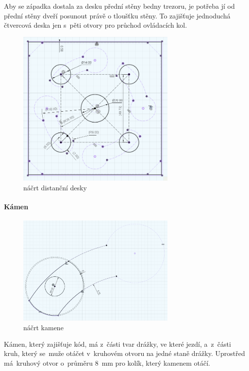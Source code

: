 Aby se západka dostala za desku přední stěny bedny trezoru, je potřeba jí od přední stěny dveří posunout právě o tloušťku stěny. To zajišťuje jednoduchá čtvercová deska jen s~pěti otvory
pro průchod ovládacích kol.


\begin{figure}
	\centering
    \includegraphics[width=0.7\textwidth]{kapitoly/obrazky/M3/distancka.png}
    \caption{náčrt distanční desky}
    \label{fig:M3-distancka}
\end{figure}


\paragraph{Kámen} %
\begin{figure}
	\centering
    \includegraphics[width=0.7\textwidth]{kapitoly/obrazky/M3/kamen.png}
    \caption{náčrt kamene}
    \label{fig:M3-kamen}
\end{figure}

Kámen, který zajišťuje kód, má z~části tvar drážky, ve které jezdí, a~z~části kruh, který se~muže otáčet v~kruhovém otvoru na jedné staně drážky.
Uprostřed má~kruhový otvor o~průměru 8~mm pro kolík, který kamenem otáčí.

